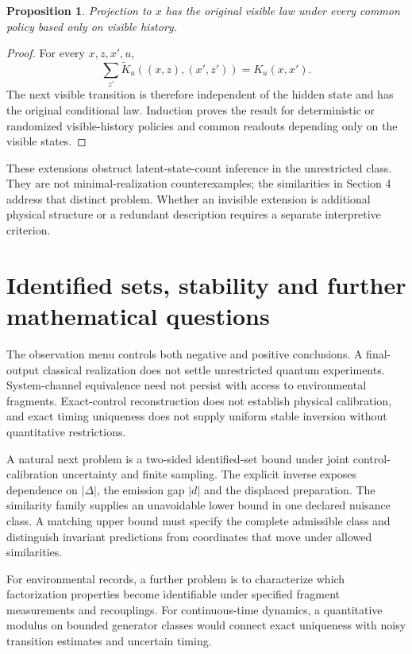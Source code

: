 \documentclass[11pt,letterpaper]{article}
\newtheorem{proposition}[theorem]{Proposition}
\begin{document}
\begin{proposition}
Projection to \(x\) has the original visible law under every common
policy based only on visible history.
\end{proposition}
\begin{proof}
For every \(x,z,x',u\),
\[
 \sum_{z'}\widetilde K_u((x,z),(x',z'))=K_u(x,x').
\]
The next visible transition is therefore independent of the hidden state
and has the original conditional law. Induction proves the result for
deterministic or randomized visible-history policies and common readouts
depending only on the visible states.
\end{proof}

These extensions obstruct latent-state-count inference in the unrestricted
class. They are not minimal-realization counterexamples; the similarities
in Section 4 address that distinct problem. Whether an invisible extension
is additional physical structure or a redundant description requires
a separate interpretive criterion.



\section{Identified sets, stability and further mathematical questions}

The observation menu controls both negative and positive conclusions.
A final-output classical realization does not settle unrestricted quantum
experiments. System-channel equivalence need not persist with access to
environmental fragments. Exact-control reconstruction does not establish
physical calibration, and exact timing uniqueness does not supply uniform
stable inversion without quantitative restrictions.

A natural next problem is a two-sided identified-set bound under joint
control-calibration uncertainty and finite sampling. The explicit inverse
exposes dependence on \(|\Delta|\), the emission gap \(|d|\) and the
displaced preparation. The similarity family supplies an unavoidable lower
bound in one declared nuisance class. A matching upper bound must specify
the complete admissible class and distinguish invariant predictions from
coordinates that move under allowed similarities.

For environmental records, a further problem is to characterize which
factorization properties become identifiable under specified fragment
measurements and recouplings. For continuous-time dynamics, a quantitative
modulus on bounded generator classes would connect exact uniqueness with
noisy transition estimates and uncertain timing.
\end{document}
